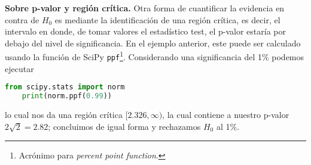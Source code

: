 \textbf{Sobre p-valor y región crítica.}
Otra forma de cuantificar la evidencia en contra de $H_0$ es mediante la identificación de una región crítica, es decir, el intervalo en donde, de tomar valores el estadístico test, el p-valor estaría por debajo del nivel de significancia. En el ejemplo anterior, este puede ser calculado usando la función de SciPy \texttt{ppf}\footnote{Acrónimo para \emph{percent point function}.}. Considerando una significancia del 1\% podemos ejecutar
\begin{lstlisting}[language=Python]
	from scipy.stats import norm
	print(norm.ppf(0.99))
\end{lstlisting}
lo cual nos da una región crítica $[2.326,\infty)$, la cual contiene a nuestro p-valor $2\sqrt{2} = 2.82$; concluimos de igual forma y rechazamos $H_0$ al 1\%. 

\begin{remark}
	
\end{remark}

